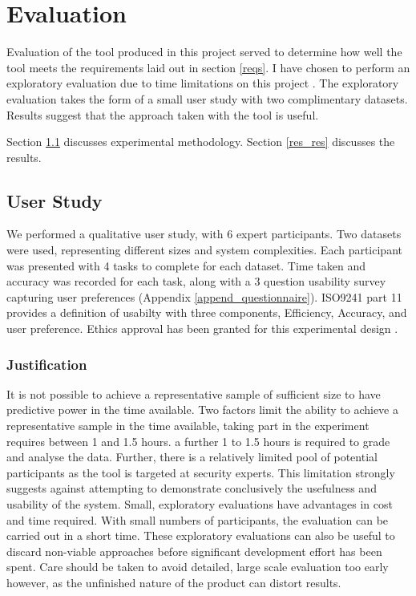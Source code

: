 \chapter{Evaluation}\label{C:eval}

Evaluation of the tool produced in this project served to determine how well the tool meets the requirements laid out in section \ref{reqs}. I have chosen to perform an exploratory evaluation due to time limitations on this project \cite{Ellis:2006:EAU:1168149.1168152}. The exploratory evaluation takes the form of a small user study with two complimentary datasets. Results suggest that the approach taken with the tool is useful. 

Section \ref{res_study} discusses experimental methodology. Section \ref{res_res} discusses the results. 

\section{User Study}\label{res_study}

We performed a qualitative user study, with 6 expert participants. Two datasets were used, representing different sizes and system complexities. Each participant was presented with 4 tasks to complete for each dataset. Time taken and accuracy was recorded for each task, along with a 3 question usability survey capturing user preferences (Appendix \ref{append_questionnaire}). ISO9241 part 11 \cite{iso9241} provides a definition of usabilty with three components, Efficiency, Accuracy, and user preference. 
Ethics approval has been granted for this experimental design \cite{leliel2013ethics}. 

\subsection{Justification}
It is not possible to achieve a representative sample of sufficient size to have predictive power in the time available. Two factors limit the ability to achieve a representative sample in the time available, taking part in the experiment requires between 1 and 1.5 hours. a further 1 to 1.5 hours is required to grade and analyse the data. Further, there is a relatively limited pool of potential participants as the tool is targeted at security experts. This limitation strongly suggests against attempting to demonstrate conclusively the usefulness and usability of the system. Small, exploratory evaluations have advantages in cost and time required. With small numbers of participants, the evaluation can be carried out in a short time. These exploratory evaluations can also be useful to discard non-viable approaches before significant development effort has been spent. Care should be taken to avoid detailed, large scale evaluation too early however, as the unfinished nature of the product can distort results. 

